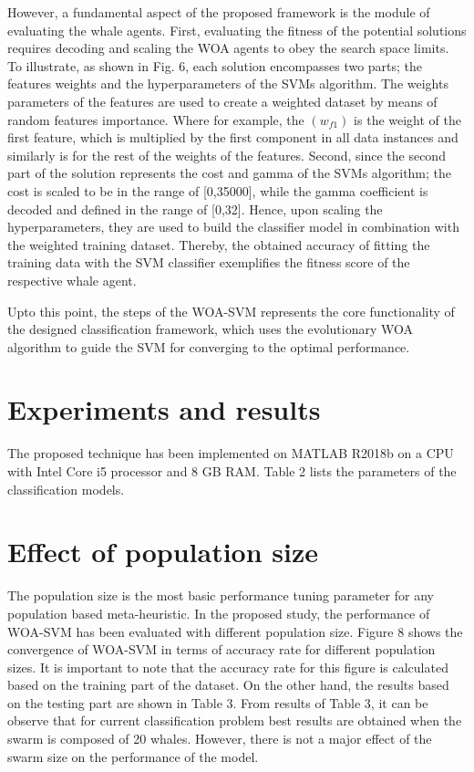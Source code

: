 \documentclass{article}
\begin{document}
However, a fundamental aspect of the proposed framework is the module of evaluating the whale agents. First, evaluating the fitness of the potential solutions requires decoding and scaling the WOA agents to obey the search space limits. To illustrate, as shown in Fig. 6, each solution encompasses two parts; the features weights and the hyperparameters of the SVMs algorithm. The weights parameters of the features are used to create a weighted dataset by means of random features importance. Where for example, the $(w_{f1})$ is the weight of the first feature, which is multiplied by the first component in all data instances and similarly is for the rest of the weights of the features. Second, since the second part of the solution represents the cost and gamma of the SVMs algorithm; the cost is scaled to be in the range of [0,35000], while the gamma coefficient is decoded and defined in the range of [0,32]. Hence, upon scaling the hyperparameters, they are used to build the classifier model in combination with the weighted training dataset. Thereby, the obtained accuracy of fitting the training data with the SVM classifier exemplifies the fitness score of the respective whale agent.


Upto this point, the steps of the WOA-SVM represents the core functionality of the designed classification framework, which uses the evolutionary WOA algorithm to guide the SVM for converging to the optimal performance.


\section{Experiments and results}


The proposed technique has been implemented on MATLAB R2018b on a CPU with Intel Core i5 processor and 8 GB RAM. Table 2 lists the parameters of the classification models.


\section{Effect of population size}


The population size is the most basic performance tuning parameter for any population based meta-heuristic. In the proposed study, the performance of WOA-SVM has been evaluated with different population size. Figure 8 shows the convergence of WOA-SVM in terms of accuracy rate for different population sizes. It is important to note that the accuracy rate for this figure is calculated based on the training part of the dataset. On the other hand, the results based on the testing part are shown in Table 3. From results of Table 3, it can be observe that for current classification problem best results are obtained when the swarm is composed of 20 whales. However, there is not a major effect of the swarm size on the performance of the model.
\end{document}
